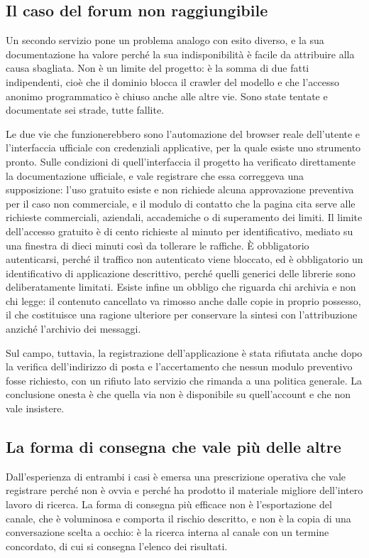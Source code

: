 \subsection{Il caso del forum non raggiungibile}

Un secondo servizio pone un problema analogo con esito diverso, e la sua documentazione ha valore perché la sua indisponibilità è facile da attribuire alla causa sbagliata. Non è un limite del progetto: è la somma di due fatti indipendenti, cioè che il dominio blocca il crawler del modello e che l'accesso anonimo programmatico è chiuso anche alle altre vie. Sono state tentate e documentate sei strade, tutte fallite.

Le due vie che funzionerebbero sono l'automazione del browser reale dell'utente e l'interfaccia ufficiale con credenziali applicative, per la quale esiste uno strumento pronto. Sulle condizioni di quell'interfaccia il progetto ha verificato direttamente la documentazione ufficiale, e vale registrare che essa correggeva una supposizione: l'uso gratuito esiste e non richiede alcuna approvazione preventiva per il caso non commerciale, e il modulo di contatto che la pagina cita serve alle richieste commerciali, aziendali, accademiche o di superamento dei limiti. Il limite dell'accesso gratuito è di cento richieste al minuto per identificativo, mediato su una finestra di dieci minuti così da tollerare le raffiche. È obbligatorio autenticarsi, perché il traffico non autenticato viene bloccato, ed è obbligatorio un identificativo di applicazione descrittivo, perché quelli generici delle librerie sono deliberatamente limitati. Esiste infine un obbligo che riguarda chi archivia e non chi legge: il contenuto cancellato va rimosso anche dalle copie in proprio possesso, il che costituisce una ragione ulteriore per conservare la sintesi con l'attribuzione anziché l'archivio dei messaggi.

Sul campo, tuttavia, la registrazione dell'applicazione è stata rifiutata anche dopo la verifica dell'indirizzo di posta e l'accertamento che nessun modulo preventivo fosse richiesto, con un rifiuto lato servizio che rimanda a una politica generale. La conclusione onesta è che quella via non è disponibile su quell'account e che non vale insistere.

\subsection{La forma di consegna che vale più delle altre}

Dall'esperienza di entrambi i casi è emersa una prescrizione operativa che vale registrare perché non è ovvia e perché ha prodotto il materiale migliore dell'intero lavoro di ricerca. La forma di consegna più efficace non è l'esportazione del canale, che è voluminosa e comporta il rischio descritto, e non è la copia di una conversazione scelta a occhio: è la ricerca interna al canale con un termine concordato, di cui si consegna l'elenco dei risultati.

